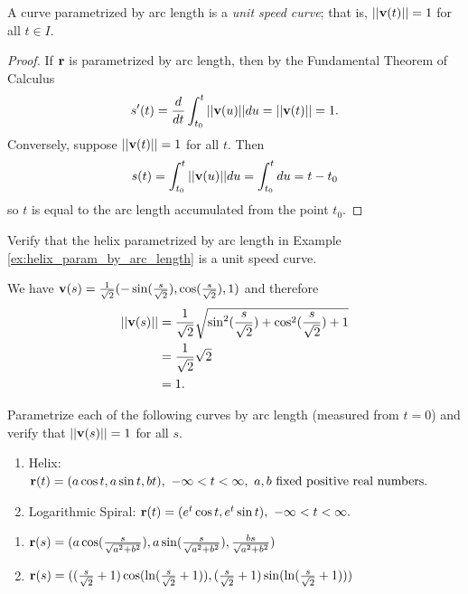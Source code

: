 \documentclass[12pt,letterpaper,reqno]{article}
\numberwithin{equation}{section}
\newcommand{\bv}{{\bf v}}
\newcommand{\bbr}{{\bf r}}
\begin{document}
{\begin{prop}
	A curve parametrized by arc length is a \emph{unit speed curve}; that is, $||\bv(t)||=1$ for all $t \in I$.
\end{prop}

\begin{proof}
	If $\bbr$ is parametrized by arc length, then by the Fundamental Theorem of Calculus
	\begin{align*}
		s'(t)=\frac{d}{dt}\int_{t_0}^t||\bv(u)||du=||\bv(t)||=1.
	\end{align*}
	Conversely, suppose $||\bv(t)||=1$ for all $t$. Then
	\begin{align*}
		s(t)=\int_{t_0}^t||\bv(u)||du=\int_{t_0}^tdu=t-t_0
	\end{align*}
	so $t$ is equal to the arc length accumulated from the point $t_0$.
\end{proof}

\begin{exercise}
Verify that the helix parametrized by arc length in Example \ref{ex:helix_param_by_arc_length} is a unit speed curve.	
\end{exercise}

{\color{red}
\begin{solution}
We have $\bv(s)=\frac{1}{\sqrt{2}}(-\sin(\frac{s}{\sqrt{2}}), \cos(\frac{s}{\sqrt{2}}),1)$ and therefore 
\begin{align*}
	||\bv(s)||&=\frac{1}{\sqrt{2}}\sqrt{\sin^2(\frac{s}{\sqrt{2}})+\cos^2(\frac{s}{\sqrt{2}})+1} \\
	&=\frac{1}{\sqrt{2}}\sqrt{2} \\
	&=1.
\end{align*}	
\end{solution}
}

\begin{exercise}
Parametrize each of the following curves by arc length (measured from $t=0$) and verify that $||\bv(s)||=1$ for all $s$.
\begin{enumerate}[(1)]
	\item Helix: $\bbr(t)=(a\cos t, a \sin t, bt), \ -\infty<t<\infty, \ a,b \text{ fixed positive real numbers.}$
	\item Logarithmic Spiral: $\bbr(t)=(e^t \cos t, e^t \sin t), \ -\infty<t<\infty.$
\end{enumerate}	
\end{exercise}

{\color{red}
\begin{solution}
\begin{enumerate}[(1)]
	\item $\bbr(s)=(a \cos(\frac{s}{\sqrt{a^2+b^2}}),a \sin(\frac{s}{\sqrt{a^2+b^2}}),\frac{bs}{\sqrt{a^2+b^2}})$
	\item $\bbr(s)=((\frac{s}{\sqrt{2}}+1)\cos(\ln(\frac{s}{\sqrt{2}}+1)),(\frac{s}{\sqrt{2}}+1)\sin(\ln(\frac{s}{\sqrt{2}}+1)))$
\end{enumerate}	
\end{solution}

}}
\end{document}
